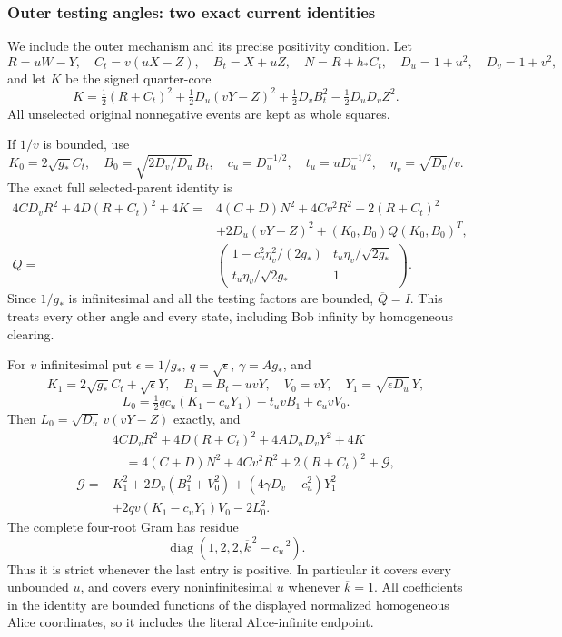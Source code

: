 \subsubsection*{Outer testing angles: two exact current identities}

We include the outer mechanism and its precise positivity condition.
Let
\[
 R=uW-Y,\quad C_t=v(uX-Z),\quad B_t=X+uZ,\quad
 N=R+h_*C_t,\quad D_u=1+u^2,\quad D_v=1+v^2,
\]
and let $K$ be the signed quarter-core
\[
 K=\tfrac12(R+C_t)^2+\tfrac12D_u(vY-Z)^2
             +\tfrac12D_v B_t^2-\tfrac12D_uD_vZ^2.       \tag{R1N12}
\]
All unselected original nonnegative events are kept as whole squares.

If $1/v$ is bounded, use
\[
 K_0=2\sqrt{g_*}C_t,\quad
 B_0=\sqrt{2D_v/D_u}\,B_t,\quad
 c_u=D_u^{-1/2},\quad t_u=uD_u^{-1/2},\quad
 \eta_v=\sqrt{D_v}/v .
\]
The exact full selected-parent identity is
\begin{align*}
 4CD_vR^2+4D(R+C_t)^2+4K
 ={}&4(C+D)N^2+4Cv^2R^2+2(R+C_t)^2\\
 &+2D_u(vY-Z)^2+(K_0,B_0)Q(K_0,B_0)^T,\\
 Q={}&
 \begin{pmatrix}
 1-c_u^2\eta_v^2/(2g_*)&t_u\eta_v/\sqrt{2g_*}\\
 t_u\eta_v/\sqrt{2g_*}&1
 \end{pmatrix}.
\tag{R1N13}
\end{align*}
Since $1/g_*$ is infinitesimal and all the testing factors are bounded,
$\overline Q=I$.  This treats every other angle and every state,
including Bob infinity by homogeneous clearing.

For $v$ infinitesimal put $\epsilon=1/g_*$, $q=\sqrt\epsilon$,
$\gamma=Ag_*$, and
\[
 K_1=2\sqrt{g_*}C_t+\sqrt\epsilon Y,\quad
 B_1=B_t-uvY,\quad V_0=vY,\quad Y_1=\sqrt{\epsilon D_u}\,Y,
\]
\[
 L_0=\tfrac12qc_u(K_1-c_uY_1)-t_uvB_1+c_uvV_0.
\]
Then $L_0=\sqrt{D_u}\,v(vY-Z)$ exactly, and
\begin{align*}
 &4CD_vR^2+4D(R+C_t)^2+4AD_uD_vY^2+4K\\
 &\quad=4(C+D)N^2+4Cv^2R^2+2(R+C_t)^2+\mathcal G,\\
 \mathcal G={}&K_1^2+2D_v(B_1^2+V_0^2)
 +(4\gamma D_v-c_u^2)Y_1^2\\
 &+2qv(K_1-c_uY_1)V_0-2L_0^2 .
\tag{R1N14}
\end{align*}
The complete four-root Gram has residue
\[
 \operatorname{diag}(1,2,2,\overline{k}^{\,2}
                                      -\overline{c_u}^{\,2}).    \tag{R1N15}
\]
Thus it is strict whenever the last entry is positive.  In particular
it covers every unbounded $u$, and covers every noninfinitesimal
$u$ whenever $\overline k=1$.  All coefficients in the identity
are bounded functions of the displayed normalized homogeneous Alice
coordinates, so it includes the literal Alice-infinite endpoint.

